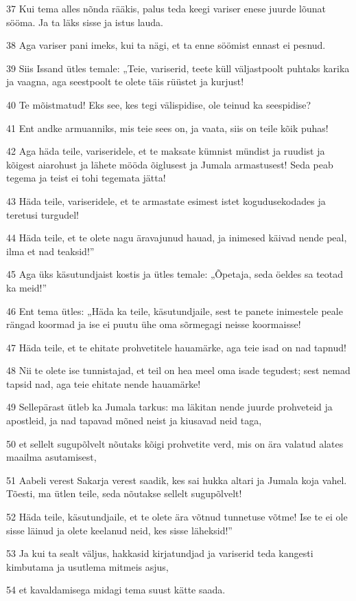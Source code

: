 \par 37 Kui tema alles nõnda rääkis, palus teda keegi variser enese juurde lõunat sööma. Ja ta läks sisse ja istus lauda.
\par 38 Aga variser pani imeks, kui ta nägi, et ta enne söömist ennast ei pesnud.
\par 39 Siis Issand ütles temale: „Teie, variserid, teete küll väljastpoolt puhtaks karika ja vaagna, aga seestpoolt te olete täis rüüstet ja kurjust!
\par 40 Te mõistmatud! Eks see, kes tegi välispidise, ole teinud ka seespidise?
\par 41 Ent andke armuanniks, mis teie sees on, ja vaata, siis on teile kõik puhas!
\par 42 Aga häda teile, variseridele, et te maksate kümnist mündist ja ruudist ja kõigest aiarohust ja lähete mööda õiglusest ja Jumala armastusest! Seda peab tegema ja teist ei tohi tegemata jätta!
\par 43 Häda teile, variseridele, et te armastate esimest istet kogudusekodades ja teretusi turgudel!
\par 44 Häda teile, et te olete nagu äravajunud hauad, ja inimesed käivad nende peal, ilma et nad teaksid!”
\par 45 Aga üks käsutundjaist kostis ja ütles temale: „Õpetaja, seda öeldes sa teotad ka meid!”
\par 46 Ent tema ütles: „Häda ka teile, käsutundjaile, sest te panete inimestele peale rängad koormad ja ise ei puutu ühe oma sõrmegagi neisse koormaisse!
\par 47 Häda teile, et te ehitate prohvetitele hauamärke, aga teie isad on nad tapnud!
\par 48 Nii te olete ise tunnistajad, et teil on hea meel oma isade tegudest; sest nemad tapsid nad, aga teie ehitate nende hauamärke!
\par 49 Sellepärast ütleb ka Jumala tarkus: ma läkitan nende juurde prohveteid ja apostleid, ja nad tapavad mõned neist ja kiusavad neid taga,
\par 50 et sellelt sugupõlvelt nõutaks kõigi prohvetite verd, mis on ära valatud alates maailma asutamisest,
\par 51 Aabeli verest Sakarja verest saadik, kes sai hukka altari ja Jumala koja vahel. Tõesti, ma ütlen teile, seda nõutakse sellelt sugupõlvelt!
\par 52 Häda teile, käsutundjaile, et te olete ära võtnud tunnetuse võtme! Ise te ei ole sisse läinud ja olete keelanud neid, kes sisse läheksid!”
\par 53 Ja kui ta sealt väljus, hakkasid kirjatundjad ja variserid teda kangesti kimbutama ja usutlema mitmeis asjus,
\par 54 et kavaldamisega midagi tema suust kätte saada.


